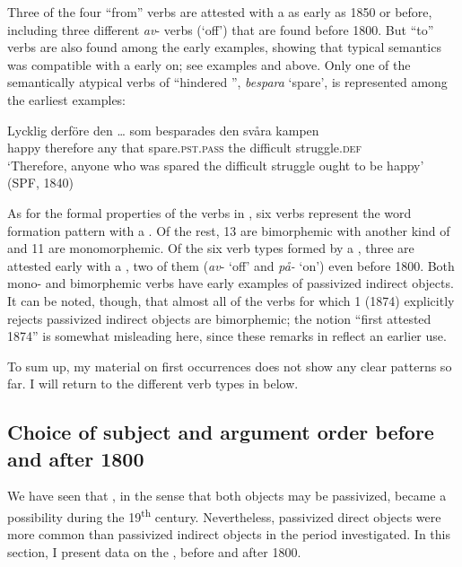 \documentclass[output=paper]{langscibook}
\begin{document}
Three of the four “from” verbs are attested with a  as early as 1850 or before, including three different \textit{av}{}- verbs (‘off’) that are found before 1800. But “to” verbs are also found among the early examples, showing that typical  semantics was compatible with a  early on; see examples  and  above. Only one of the semantically atypical verbs of “hindered ”, \textit{bespara} ‘spare’, is represented among the earliest examples:


\ea%
    \label{ex:falk:19}
\gll Lycklig  derföre    den  …  som  besparades      den  svåra    kampen\\
    happy  therefore  any  {}    that  spare.\textsc{pst}.\textsc{pass}  the  difficult  struggle.\textsc{def}\\
\glt ‘Therefore, anyone who was spared the difficult struggle ought to be happy’ (SPF, 1840)
\z

As for the formal properties of the verbs in , six verbs represent the word formation pattern with a . Of the rest, 13 are bimorphemic with another kind of  and 11 are monomorphemic. Of the six verb types formed by a , three are attested early with a , two of them (\textit{av}{}- ‘off’ and \textit{på-} ‘on’) even before 1800. Both mono- and bimorphemic verbs have early examples of passivized indirect objects. It can be noted, though, that almost all of the verbs for which  1 (1874) explicitly rejects passivized indirect objects are bimorphemic; the notion “first attested 1874” is somewhat misleading here, since these remarks in  reflect an earlier use.


To sum up, my material on first occurrences does not show any clear patterns so far. I will return to the different verb types in  below.


\subsection{Choice of subject and argument order before and after 1800}\label{sec:falk:3.8}


We have seen that , in the sense that both objects may be passivized, became a possibility during the 19\textsuperscript{th} century. Nevertheless, passivized direct objects were more common than passivized indirect objects in the period investigated. In this section, I present data on the , before and after 1800.
\end{document}
